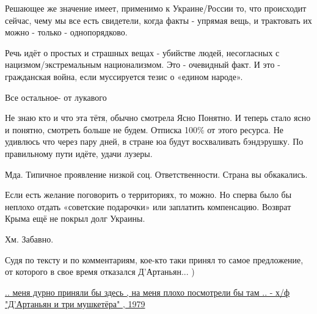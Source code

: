 \begin{itemize}
Решающее же значение имеет, применимо к Украине/России то, что происходит
сейчас, чему мы все есть свидетели, когда факты - упрямая вещь, и трактовать их
можно - только - однопорядково.

Речь идёт о простых и страшных вещах - убийстве людей, несогласных с
нацизмом/экстремальным национализмом. Это - очевидный факт. И это - гражданская
война, если муссируется тезис о «едином народе».

Все остальное- от лукавого


 

Не знаю кто и что эта тётя, обычно смотрела Ясно Понятно. И теперь стало ясно и
понятно, смотреть больше не будем. Отписка 100\% от этого ресурса. Не удивлюсь
что через пару дней, в стране юа будут восхваливать бэндэрушку. По правильному
пути идёте, удачи лузеры.

 
Мда. Типичное проявление низкой соц. Ответственности. Страна вы обкакались.

 
Если есть желание поговорить о территориях, то можно. Но сперва было бы неплохо отдать «советские подарочки» или заплатить компенсацию. Возврат Крыма ещё не покрыл долг Украины.

 

Хм. Забавно.

Судя по тексту и по комментариям, кое-кто таки принял то самое предложение, от которого в свое время отказался Д'Артаньян... )

\href{https://www.youtube.com/watch?v=jYoisH5XftM}{%
.. меня дурно приняли бы здесь , на меня плохо посмотрели бы там .. - х/ф "Д'Артаньян и три мушкетёра" , 1979%
}


\end{itemize}
